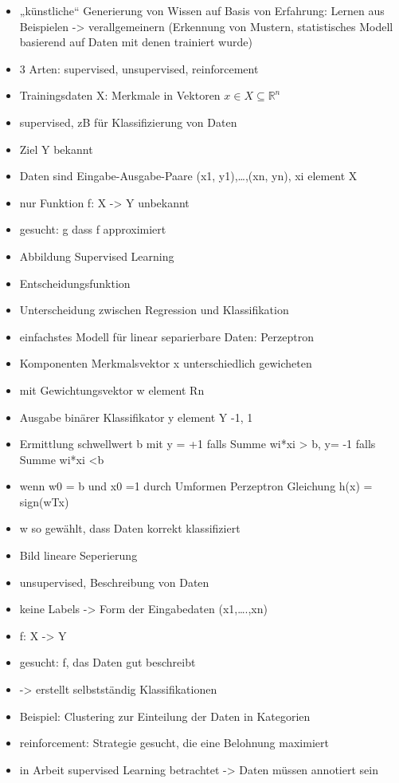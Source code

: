 	\begin{itemize}
		\item „künstliche“ Generierung von Wissen auf Basis von Erfahrung: Lernen aus Beispielen -> verallgemeinern (Erkennung von Mustern, statistisches Modell basierend auf Daten mit denen trainiert wurde)
		\item 3 Arten: supervised, unsupervised, reinforcement
		\item Trainingsdaten X: Merkmale in Vektoren $x \in X \subseteq \mathbb{R}^n$
		\item supervised, zB für Klassifizierung von Daten
		\item Ziel Y bekannt
		\item Daten sind Eingabe-Ausgabe-Paare (x1, y1),…,(xn, yn), xi element X
		\item nur Funktion f: X -> Y unbekannt
		\item gesucht: g dass f approximiert
		\item Abbildung Supervised Learning
		\item Entscheidungsfunktion
		\item Unterscheidung zwischen Regression und Klassifikation
		\item einfachstes Modell für linear separierbare Daten: Perzeptron
		\item Komponenten Merkmalsvektor x unterschiedlich gewicheten
		\item mit Gewichtungsvektor w element Rn
		\item Ausgabe binärer Klassifikator y element Y {-1, 1}
		\item Ermittlung schwellwert b mit y = +1 falls Summe wi*xi > b, y= -1 falls Summe wi*xi <b
		\item wenn w0 = b und x0 =1 durch Umformen Perzeptron Gleichung h(x) = sign(wTx)
		\item w so gewählt, dass Daten korrekt klassifiziert
		\item Bild lineare Seperierung
		\item unsupervised, Beschreibung von Daten
		\item keine Labels -> Form der Eingabedaten (x1,….,xn)
		\item f: X -> Y
		\item gesucht: f, das Daten gut beschreibt
		\item -> erstellt selbstständig Klassifikationen
		\item Beispiel: Clustering zur Einteilung der Daten in Kategorien
		\item reinforcement: Strategie gesucht, die eine Belohnung maximiert
		\item in Arbeit supervised Learning betrachtet -> Daten müssen annotiert sein
	\end{itemize}
	
